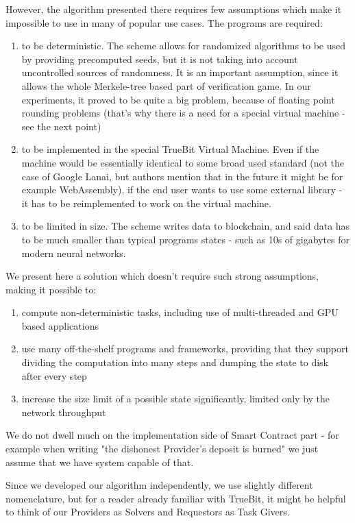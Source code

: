 \documentclass{winnower}
\begin{document}
However, the algorithm presented there requires few assumptions which make it impossible to use in many of popular use cases. The programs are required:
\begin{enumerate}
\item  to be deterministic. The scheme allows for randomized algorithms to be used by providing precomputed seeds, but it is not taking into account uncontrolled sources of randomness. It is an important assumption, since it allows the whole Merkele-tree based part of verification game. In our experiments, it proved to be quite a big problem, because of floating point rounding problems (that's why there is a need for a special virtual machine - see the next point) 
\item to be implemented in the special TrueBit Virtual Machine. Even if the machine would be essentially identical to some broad used standard (not the case of Google Lanai, but authors mention that in the future it might be for example WebAssembly\citep{truebit}), if the end user wants to use some external library - it has to be reimplemented to work on the virtual machine.
\item to be limited in size. The scheme writes data to blockchain, and said data has to be much smaller than typical programs states - such as 10s of gigabytes for modern neural networks.
\end{enumerate}

We present here a solution which doesn't require such strong assumptions, making it possible to:
\begin{enumerate}
\item compute non-deterministic tasks, including use of multi-threaded and GPU based applications
\item use many off-the-shelf programs and frameworks, providing that they support dividing the computation into many steps and dumping the state to disk after every step
\item increase the size limit of a possible state significantly, limited only by the network throughput
\end{enumerate}

We do not dwell much on the implementation side of Smart Contract part - for example when writing "the dishonest Provider's deposit is burned" we just assume that we have system capable of that.

Since we developed our algorithm independently, we use slightly different nomenclature, but for a reader already familiar with TrueBit, it might be helpful to think of our Providers as Solvers and Requestors as Task Givers.
\end{document}
